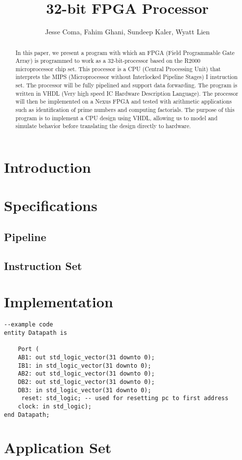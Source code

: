 \documentclass{article}
\author{Jesse Coma, Fahim Ghani, Sundeep Kaler, Wyatt Lien}
\title{32-bit FPGA Processor}
\begin{document}
\maketitle

\begin{abstract}

In this paper, we present a program with which an FPGA (Field Programmable Gate Array) is programmed to work as a 32-bit-processor based on the R2000 microprocessor chip set. This processor is a CPU (Central Processing Unit) that interprets the MIPS (Microprocessor without Interlocked Pipeline Stages) I instruction set. The processor will be fully pipelined and support data forwarding. The program is written in VHDL (Very high speed IC Hardware Description Language). The processor will then be implemented on a Nexus FPGA and tested with arithmetic applications such as identification of prime numbers and computing factorials. The purpose of this program is to implement a CPU design using VHDL, allowing us to model and simulate behavior before translating the design directly to hardware.

\end{abstract}
\section{Introduction}


\section{Specifications}

\subsection{Pipeline}

\subsection{Instruction Set}

\section{Implementation}

	
\begin{verbatim}
--example code
entity Datapath is

    Port (
    AB1: out std_logic_vector(31 downto 0);
    IB1: in std_logic_vector(31 downto 0);
    AB2: out std_logic_vector(31 downto 0);
    DB2: out std_logic_vector(31 downto 0);
    DB3: in std_logic_vector(31 downto 0);
	 reset: std_logic; -- used for resetting pc to first address
    clock: in std_logic);
end Datapath;
\end{verbatim}






\section{Application Set}
\end{document}

